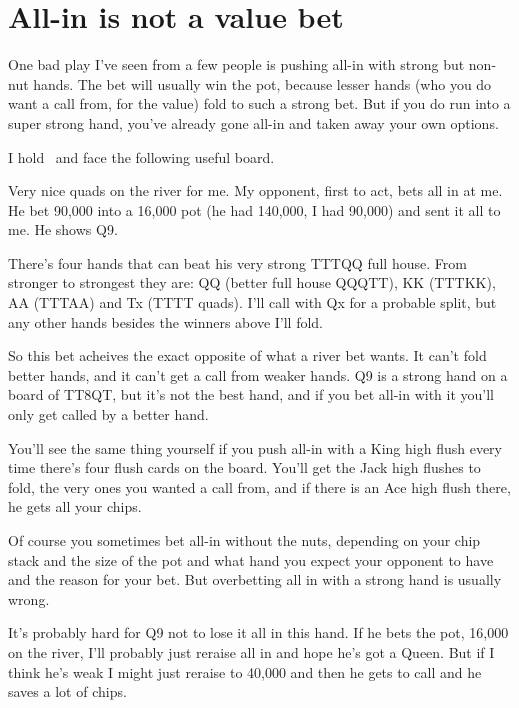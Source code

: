 \chapter{All-in is not a value bet}



One bad play I've seen from a few people is pushing all-in
with strong but non-nut hands. The bet will usually win the
pot, because lesser hands (who you do want a call from, for the
value) fold to such a strong bet. But if you do run
into a super strong hand, you've already gone all-in and taken
away your own options.

I hold \Jh\tens\ and face the following useful board.

\begin{cards}
\crdtenh\crdtenc\crdeigh\crdQd\crdtend%
\end{cards}

Very nice quads on the river for me. My opponent, first to act, bets all in 
at me. He bet 90,000 into a 16,000 pot (he had 140,000, I had 90,000) and 
sent it all to me. He shows Q9.

There's four hands that can beat his very strong TTTQQ full house.
From stronger to strongest they are: QQ (better full house QQQTT),
KK (TTTKK), AA (TTTAA) and Tx (TTTT quads). 
I'll call with Qx for a probable split, but any
other hands besides the winners above I'll fold.

So this bet acheives the exact opposite of what a river bet wants.
It can't fold better hands, and it can't get a call from weaker hands.
Q9 is a strong hand on a board of TT8QT, but it's not the best hand,
and if you bet all-in with it you'll only get called by a better hand.

You'll see the same thing yourself if you push all-in with a King 
high flush every time there's four flush cards on the board. 
You'll get the Jack high flushes to fold, the very ones you 
wanted a call from, and if there is an Ace high flush there, 
he gets all your chips.

Of course you sometimes bet all-in without the nuts, depending on
your chip stack and the size of the pot and what hand you expect
your opponent to have and the reason for your bet. But overbetting
all in with a strong hand is usually wrong.

It's probably hard for Q9 not to lose it all in this hand. If he bets
the pot, 16,000 on the river, I'll probably just reraise all in and hope
he's got a Queen. But if I think he's weak I might just reraise to 40,000
and then he gets to call and he saves a lot of chips. 
